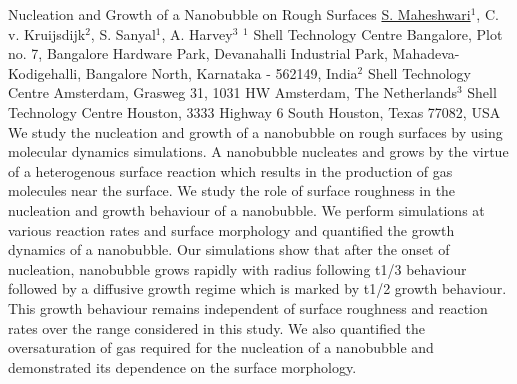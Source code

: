 
    \begin{abstract_online}{Nucleation and Growth of a Nanobubble on Rough Surfaces}{%
        \underline{S. Maheshwari}$^{1}$, C. v. Kruijsdijk$^{2}$, S. Sanyal$^{1}$, A. Harvey$^{3}$}{%
        \IStag}{%
        $^1$ Shell Technology Centre Bangalore, Plot no. 7, Bangalore Hardware Park, Devanahalli Industrial Park, Mahadeva-Kodigehalli, Bangalore North, Karnataka - 562149, India\newline{}$^2$ Shell Technology Centre Amsterdam, Grasweg 31, 1031 HW Amsterdam, The Netherlands\newline{}$^3$ Shell Technology Centre Houston, 3333 Highway 6 South Houston, Texas 77082, USA}
    We study the nucleation and growth of a nanobubble on rough surfaces by using molecular dynamics simulations. A nanobubble nucleates and grows by the virtue of a heterogenous surface reaction which results in the production of gas molecules near the surface. We study the role of surface roughness in the nucleation and growth behaviour of a nanobubble. We perform simulations at various reaction rates and surface morphology and quantified the growth dynamics of a nanobubble. Our simulations show that after the onset of nucleation, nanobubble grows rapidly with radius following t1/3 behaviour followed by a diffusive growth regime which is marked by t1/2 growth behaviour. This growth behaviour remains independent of surface roughness and reaction rates over the range considered in this study. We also quantified the oversaturation of gas required for the nucleation of a nanobubble and demonstrated its dependence on the surface morphology. 
    
    \end{abstract_online}
    